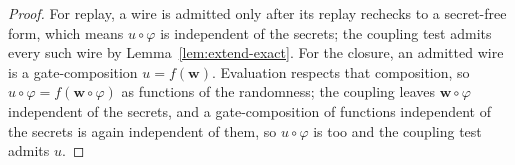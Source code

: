   \begin{proof}
  For replay, a wire is admitted only after its replay rechecks to a secret-free
  form, which means $u \circ \varphi$ is independent of the secrets; the coupling
  test admits every such wire by Lemma~\ref{lem:extend-exact}. For the closure, an
  admitted wire is a gate-composition $u = f(\mathbf{w})$. Evaluation respects that
  composition, so $u \circ \varphi = f(\mathbf{w} \circ \varphi)$ as functions of the
  randomness; the coupling leaves $\mathbf{w} \circ \varphi$ independent of the
  secrets, and a gate-composition of functions independent of the secrets is again
  independent of them, so $u \circ \varphi$ is too and the coupling test admits $u$.
  \end{proof}
